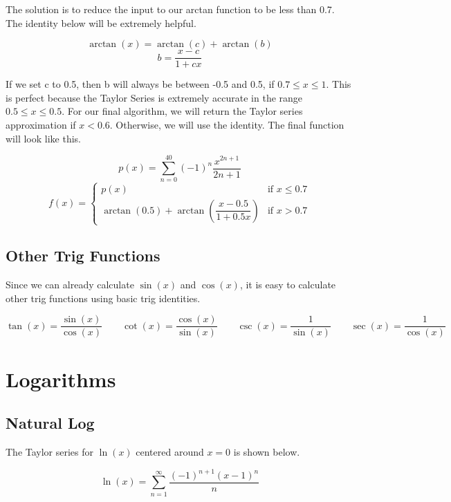 \documentclass[12pt, letterpaper]{article}
\begin{document}

The solution is to reduce the input to our arctan function to be less than 0.7. The identity below will be extremely helpful.

\[ \arctan(x) = \arctan(c) + \arctan\left(b\right) \]
\[ b = \frac{x-c}{1+cx} \]

If we set c to 0.5, then b will always be between -0.5 and 0.5, if $0.7 \leq x \leq 1$. This is perfect because the Taylor Series is extremely accurate in the range $0.5 \leq x \leq 0.5$. For our final algorithm, we will return the Taylor series approximation if $x < 0.6$. Otherwise, we will use the identity. The final function will look like this.

\[ p(x) = \sum_{n=0}^{40}\left(-1\right)^{n}\frac{x^{2n+1}}{2n+1} \]
\[ f(x) = \begin{cases}
  p(x) & \text{if } x \leq 0.7 \\
  \arctan(0.5) + \arctan\left(\dfrac{x-0.5}{1+0.5x}\right) & \text{if } x > 0.7
\end{cases} \]

\subsection{Other Trig Functions}
Since we can already calculate $\sin(x)$ and $\cos(x)$, it is easy to calculate other trig functions using basic trig identities.

\[ \tan(x) = \frac{\sin(x)}{\cos(x)} \qquad \cot(x) = \frac{\cos(x)}{\sin(x)}  \qquad \csc(x) = \frac{1}{\sin(x)} \qquad \sec(x) = \frac{1}{\cos(x)}
\]

\section{Logarithms}
\subsection{Natural Log}
The Taylor series for $\ln(x)$ centered around $x=0$ is shown below.

\[ \ln(x) = \sum_{n=1}^{\infty}\frac{\left(-1\right)^{n+1}\left(x-1\right)^{n}}{n} \]
\end{document}
